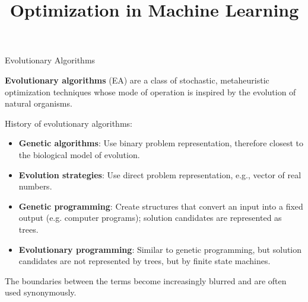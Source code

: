 \documentclass[11pt,compress,t,notes=noshow, xcolor=table]{beamer}
\title{Optimization in Machine Learning}
\date{}
\begin{document}
\sloppy


\begin{vbframe}{Evolutionary Algorithms}

\textbf{Evolutionary algorithms} (EA) are a class of stochastic, metaheuristic optimization techniques whose mode of operation is inspired by the evolution of natural organisms.

\vspace{0.5cm}
\footnotesize
History of evolutionary algorithms:

\begin{itemize}
\item \textbf{Genetic algorithms}: Use binary problem representation, therefore closest to the biological model of evolution.
\item \textbf{Evolution strategies}: Use direct problem representation, e.g., vector of real numbers.
\item \textbf{Genetic programming}: Create structures that convert an input into a fixed output (e.g. computer programs); solution candidates are represented as trees.
\item \textbf{Evolutionary programming}: Similar to genetic programming, but solution candidates are not represented by trees, but by finite state machines.
\end{itemize}

The boundaries between the terms become increasingly blurred and are often used synonymously.
\end{vbframe}
\end{document}
